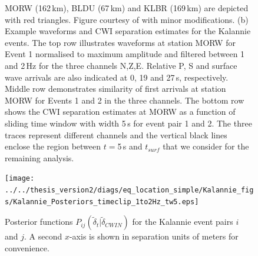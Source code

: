 \documentclass[grl]{agutex}
\begin{document}
\begin{figure}
{MORW (162\,km), BLDU (67\,km) and KLBR (169\,km) are depicted with red triangles. Figure courtesy of
\citet{dr_Dawson08a} with minor modifications. (b) Example waveforms and CWI separation estimates
for the Kalannie events. The top row illustrates waveforms at station MORW for Event 1 normalised to maximum
amplitude and filtered between 1 and 2\,Hz for the three channels N,Z,E. Relative P, S and surface wave arrivals are also
indicated at 0, 19 and 27\,s, respectively. Middle row demonstrates similarity of first arrivals at station MORW for Events 1 and 2 in
the three channels. The bottom row shows the CWI separation estimates at MORW
as a function of sliding time window with width 5\,s for event pair 1 and 2. The three traces
represent different channels and the vertical black lines
enclose the region between $t=$5\,s and $t_{surf}$ that we consider for the remaining analysis.}
\label{fig:-Kalannie-map}
\end{figure}


\begin{figure}
\noindent\texttt{[image: ../../thesis\_version2/diags/eq\_location\_simple/Kalannie\_figs/Kalannie\_Posteriors\_timeclip\_1to2Hz\_tw5.eps]}
\caption{Posterior functions $P_{ij}(\widetilde{\delta}_{t}|\widetilde{\delta}_{CWIN})$ for the Kalannie
event pairs $i$ and $j$. A
second $x$-axis is shown in separation units of meters for convenience.}
\label{fig:Kalannie-CWI-Posteriors}
\end{figure}
\end{document}
